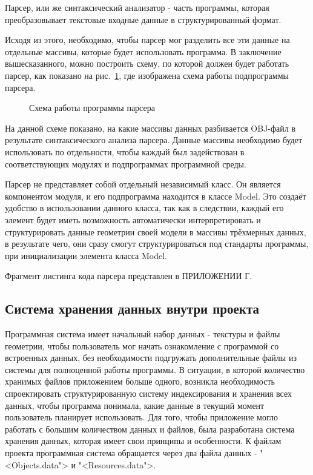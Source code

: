 Парсер, или же синтаксический анализатор - часть программы, которая преобразовывает текстовые входные данные в структурированный формат.

Исходя из этого, необходимо, чтобы парсер мог разделить все эти данные на отдельные массивы, которые будет использовать программа. В заключение вышесказанного, можно построить схему, по которой должен будет работать парсер, как показано на рис.~\ref{diagram4:image}, где изображена схема работы подпрограммы парсера.

\begin{figure}[ht]
	\caption{Схема работы программы парсера}
	\label{diagram4:image}
\end{figure}

На данной схеме показано, на какие массивы данных разбивается OBJ-файл в результате синтаксического анализа парсера. Данные массивы необходимо будет использовать по отдельности, чтобы каждый был задействован в соответствующих модулях и подпрограммах программной среды.

Парсер не представляет собой отдельный независимый класс. Он является компонентом модуля, и его подпрограмма находится в классе Model. Это создаёт удобство в использовании данного класса, так как в следствии, каждый его элемент будет иметь возможность автоматически интерпретировать и структурировать данные геометрии своей модели в массивы трёхмерных данных, в результате чего, они сразу смогут структурироваться под стандарты программы, при инициализации элемента класса Model.

Фрагмент листинга кода парсера представлен в ПРИЛОЖЕНИИ Г.

\subsection{Система хранения данных внутри проекта}

Программная система имеет начальный набор данных - текстуры и файлы геометрии, чтобы пользователь мог начать ознакомление с программой со встроенных данных, без необходимости подгружать дополнительные файлы из системы для полноценной работы программы. В ситуации, в которой количество хранимых файлов приложением больше одного, возникла необходимость спроектировать структурированную систему индексирования и хранения всех данных, чтобы программа понимала, какие данные в текущий момент пользователь планирует использовать.
Для того, чтобы приложение могло работать с большим количеством данных и файлов, была разработана система хранения данных, которая имеет свои принципы и особенности. К файлам проекта программная система обращается через два файла данных - "<Objects.data"> и "<Resources.data">.


